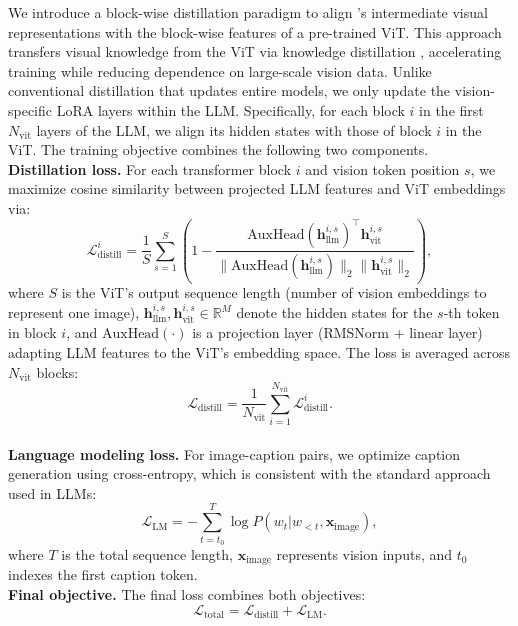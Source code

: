 We introduce a block-wise distillation paradigm to align \model{}'s intermediate visual representations with the block-wise features of a pre-trained ViT. This approach transfers visual knowledge from the ViT via knowledge distillation \cite{distillation, eva}, accelerating training while reducing dependence on large-scale vision data. Unlike conventional distillation that updates entire models, we only update the vision-specific LoRA layers within the LLM. Specifically, for each block $i$ in the first $N_{\text{vit}}$ layers of the LLM, we align its hidden states with those of block $i$ in the ViT. 
The training objective combines the following two components.
\\
\textbf{Distillation loss.} For each transformer block $i$ and vision token position $s$, we maximize cosine similarity between projected LLM features and ViT embeddings via:
\begin{equation}
    \mathcal{L}_{\text{distill}}^i = \frac{1}{S} \sum_{s=1}^S \left( 1 - \frac{
        \mathrm{AuxHead}(\bm{h}_{\text{llm}}^{i,s})^\top \bm{h}_{\text{vit}}^{i,s}
    }{
        \|\mathrm{AuxHead}(\bm{h}_{\text{llm}}^{i,s})\|_2 \|\bm{h}_{\text{vit}}^{i,s}\|_2
    } \right),
\end{equation}
where $S$ is the ViT's output sequence length (number of vision embeddings to represent one image), $\bm{h}_{\text{llm}}^{i,s}, \bm{h}_{\text{vit}}^{i,s} \in \mathbb{R}^M$ denote the hidden states for the $s$-th token in block $i$, and $\mathrm{AuxHead}(\cdot)$ is a projection layer (RMSNorm \cite{rmsnorm} + linear layer) adapting LLM features to the ViT's embedding space. The loss is averaged across $N_{\text{vit}}$ blocks:
\begin{equation}
    \mathcal{L}_{\text{distill}} = \frac{1}{N_{\text{vit}}} \sum_{i=1}^{N_{\text{vit}}} \mathcal{L}_{\text{distill}}^i.
\end{equation}
\\
\textbf{Language modeling loss.} For image-caption pairs, we optimize caption generation using cross-entropy, which is consistent with the standard approach used in LLMs:
\begin{equation} 
    \mathcal{L}_{\text{LM}} = -\sum_{t=t_0}^T \log P(w_t | w_{<t}, \bm{x}_{\text{image}}),
\end{equation}
where $T$ is the total sequence length, $\bm{x}_{\text{image}}$ represents vision inputs, and $t_0$ indexes the first caption token.
\\
\textbf{Final objective.} The final loss combines both objectives:
\begin{equation}
    \mathcal{L}_{\text{total}} = \mathcal{L}_{\text{distill}} + \mathcal{L}_{\text{LM}}.
\end{equation}

